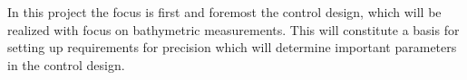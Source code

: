 %

In this project the focus is first and foremost the control design, which will be realized with focus on bathymetric measurements. This will constitute a basis for setting up requirements for precision which will determine important parameters in the control design.
